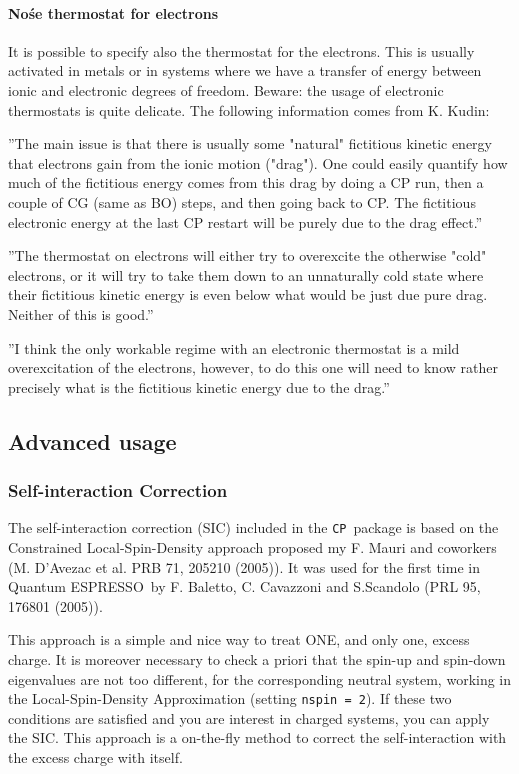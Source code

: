 \documentclass[12pt,a4paper]{article}
\def\qe{{\sc Quantum ESPRESSO}}
\def\CP{\texttt{CP}}
\begin{document}
\paragraph{ No\'se thermostat for electrons }

It is possible to specify also the thermostat for the electrons. This is
usually activated in metals or in systems where we have a transfer of
energy between ionic and electronic degrees of freedom. Beware: the
usage of electronic thermostats is quite delicate. The following information 
comes from K. Kudin: 

''The main issue is that there is usually some "natural" fictitious kinetic 
energy that electrons gain from the ionic motion ("drag"). One could easily 
quantify how much of the fictitious energy comes from this drag by doing a CP 
run, then a couple of CG (same as BO) steps, and then going back to CP.
The fictitious electronic energy at the last CP restart will be purely 
due to the drag effect.''

''The thermostat on electrons will either try to overexcite the otherwise 
"cold" electrons, or it will try to take them down to an unnaturally cold 
state where their fictitious kinetic energy is even below what would be 
just due pure drag. Neither of this is good.''

''I think the only workable regime with an electronic thermostat is a 
mild overexcitation of the electrons, however, to do this one will need 
to know rather precisely what is the fictitious kinetic energy due to the
drag.''

\subsection{Advanced usage}

\subsubsection{ Self-interaction Correction }

The self-interaction correction (SIC) included in the \CP\
package is based
on the Constrained Local-Spin-Density approach proposed my F. Mauri and 
coworkers (M. D'Avezac et al. PRB 71, 205210 (2005)). It was used for
the first time in \qe\ by F. Baletto, C. Cavazzoni 
and S.Scandolo (PRL 95, 176801 (2005)).

This approach is a simple and nice way to treat ONE, and only one, 
excess charge. It is moreover necessary to check a priori that 
the spin-up and spin-down eigenvalues are not too different, for the 
corresponding neutral system, working in the Local-Spin-Density 
Approximation (setting \texttt{nspin = 2}). If these two conditions are satisfied
and you are interest in charged systems, you can apply the SIC.
This approach is a on-the-fly method to correct the self-interaction 
with the excess charge with itself.
\end{document}
